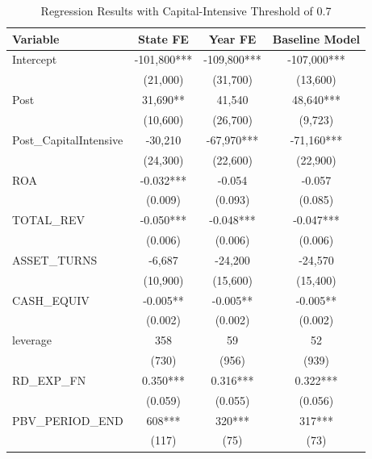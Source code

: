 \documentclass[11pt]{article}
\begin{document}
\begin{table}[htbp]
    \centering
    \caption{Regression Results with Capital-Intensive Threshold of 0.7}
    \label{0.7table}
    \begin{tabular}{lccc}
        \toprule
        \textbf{Variable} & \textbf{State FE} & \textbf{Year FE} & \textbf{Baseline Model} \\
        \midrule
        Intercept             & -101,800*** & -109,800*** & -107,000*** \\
                              & (21,000)    & (31,700)    & (13,600)    \\
        Post                  & 31,690**    & 41,540      & 48,640***   \\
                              & (10,600)    & (26,700)    & (9,723)     \\
        Post\_CapitalIntensive & -30,210     & -67,970***  & -71,160***  \\
                              & (24,300)    & (22,600)    & (22,900)    \\
        ROA                   & -0.032***   & -0.054      & -0.057      \\
                              & (0.009)     & (0.093)     & (0.085)     \\
        TOTAL\_REV            & -0.050***   & -0.048***   & -0.047***   \\
                              & (0.006)     & (0.006)     & (0.006)     \\
        ASSET\_TURNS          & -6,687      & -24,200     & -24,570     \\
                              & (10,900)    & (15,600)    & (15,400)    \\
        CASH\_EQUIV           & -0.005**    & -0.005**    & -0.005**    \\
                              & (0.002)     & (0.002)     & (0.002)     \\
        leverage              & 358         & 59          & 52          \\
                              & (730)       & (956)       & (939)       \\
        RD\_EXP\_FN           & 0.350***    & 0.316***    & 0.322***    \\
                              & (0.059)     & (0.055)     & (0.056)     \\
        PBV\_PERIOD\_END      & 608***      & 320***      & 317***      \\
                              & (117)       & (75)        & (73)        \\

\end{tabular}
\end{table}
\end{document}
